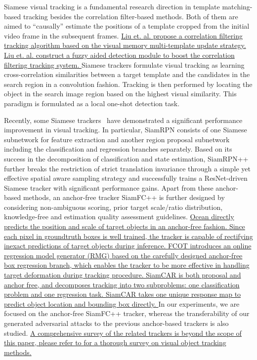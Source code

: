 \documentclass[journal]{IEEEtran}
\begin{document}
Siamese visual tracking is a fundamental research direction in template matching-based tracking besides the correlation filter-based methods. Both of them are aimed to ``causally'' estimate the positions of a template cropped from the initial video frame in the subsequent frames.
\uline{
Liu et. al. \cite{9376997} propose a correlation filtering tracking algorithm based on the visual memory multi-template update strategy.
Liu et. al. \cite{9132673} construct a fuzzy aided detection module to boost the correlation filtering tracking system.
}
Siamese trackers formulate visual tracking as learning cross-correlation similarities between a target template and the candidates in the search region in a convolution fashion. Tracking is then performed by locating the object in the search image region based on the highest visual similarity. This paradigm is formulated as a local one-shot detection task.

Recently, some Siamese trackers~\cite{SiamFC++,SiamRPN,SiamRPN++} have demonstrated a significant performance improvement in visual tracking. 
In particular, SiamRPN \cite{SiamRPN} consists of one Siamese subnetwork for feature extraction and another region proposal subnetwork including the classification and regression branches separately. Based on its success in the decomposition of classification and state estimation, SiamRPN++ \cite{SiamRPN++} further breaks the restriction of strict translation invariance through a simple yet effective spatial aware sampling strategy and successfully trains a ResNet-driven Siamese tracker with significant performance gains. Apart from these anchor-based methods, an anchor-free tracker SiamFC++ \cite{SiamFC++} is further designed by considering non-ambiguous scoring, prior target scale/ratio distribution, knowledge-free and estimation quality assessment guidelines.
\uline{
Ocean \cite{zhang2020ocean} directly predicts the position and scale of target objects in an anchor-free fashion. Since each pixel in groundtruth boxes is well trained, the tracker is capable of rectifying inexact predictions of target objects during inference.
FCOT \cite{cui2020fully} introduces an online regression model generator (RMG) based on the carefully designed anchor-free box regression branch, which enables the tracker to be more effective in handling target deformation during tracking procedure.
SiamCAR \cite{9157720} is both proposal and anchor free, and decomposes tracking into two subproblems: one classification problem and one regression task. SiamCAR takes one unique response map to predict object location and bounding box directly.
}
In our experiments, we are focused on the anchor-free SiamFC++ tracker, whereas the transferability of our generated adversarial attacks to the previous anchor-based trackers is also studied.
\uline{
A comprehensive survey of the related trackers is beyond the scope of this paper, please refer to \cite{9339950} for a thorough survey on visual object tracking methods.} 
\end{document}
